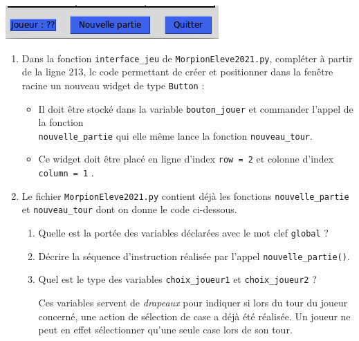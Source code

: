 \documentclass[a4paper, french, 12pt]{article}  %
\newcounter{exo}
\newcounter{exoB}
\newenvironment{exerciceB2}
{\par \bigskip  \noindent \addtocounter{exoB}{1} \hrulefill \quad { \large \textbf{Exercice \theexoB}} \quad \hrulefill \par \medskip }
{\par \bigskip }
\newcounter{act}
\begin{document}
\begin{exerciceB2}{}
 
\begin{center}
	\includegraphics[scale=0.6]{graphiques/morpion-buttons.png}
\end{center}	

\begin{enumerate}

\item Dans la fonction \lstinline+interface_jeu+ de \texttt{MorpionEleve2021.py}, compléter à partir de la ligne 213, lc code permettant de créer et positionner dans la fenêtre racine un nouveau  widget de type \lstinline+Button+ :

\begin{itemize}[label=\textbullet]
\item Il doit être stocké dans la variable  \lstinline+bouton_jouer+ et commander l'appel de la fonction \\ \lstinline+nouvelle_partie+ qui elle même lance la fonction \lstinline+nouveau_tour+.
\item Ce widget doit être placé en ligne d'index \lstinline+row = 2+ et colonne d'index \lstinline+column = 1+ . 
\end{itemize}

\item Le fichier \texttt{MorpionEleve2021.py} contient déjà  les fonctions \lstinline+nouvelle_partie+ et  \lstinline+nouveau_tour+ dont on donne le code ci-dessous.


\begin{enumerate}



	\item Quelle est la portée des variables déclarées avec le mot clef \lstinline+global+ ?
	\item Décrire la séquence d'instruction réalisée par l'appel \lstinline+nouvelle_partie()+.
	\item Quel est le type des variables \lstinline+choix_joueur1+ et \lstinline+choix_joueur2+ ?
	
	Ces variables servent de \textit{drapeaux}  pour indiquer si lors du tour du joueur concerné, une action de sélection de case a déjà été réalisée. Un joueur ne peut en effet sélectionner qu'une seule case lors de son tour.
	

\end{enumerate}
\end{enumerate}
\end{exerciceB2}
\end{document}
